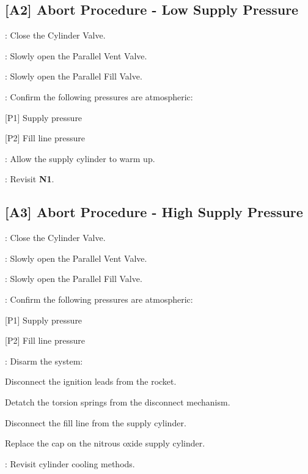 \begin{checklist}
\subsection{[A2] Abort Procedure - Low Supply Pressure}
\begin{checklist}
    \item \primary{}: Close the Cylinder Valve.
    \item \primary{}: Slowly open the Parallel Vent Valve.
    \item \primary{}: Slowly open the Parallel Fill Valve.
    \item \control{}: Confirm the following pressures are atmospheric:
    \begin{checklist}
        \item {[P1]} Supply pressure
        \item {[P2]} Fill line pressure
    \end{checklist}
    \item \primary{}: Allow the supply cylinder to warm up.
    \item \ops{}: Revisit \textbf{N1}.
\end{checklist}
\setcounter{checklistnum}{0}

\subsection{[A3] Abort Procedure - High Supply Pressure}
\begin{checklist}
    \item \primary{}: Close the Cylinder Valve.
    \item \primary{}: Slowly open the Parallel Vent Valve.
    \item \primary{}: Slowly open the Parallel Fill Valve.
    \item \control{}: Confirm the following pressures are atmospheric:
    \begin{checklist}
        \item {[P1]} Supply pressure
        \item {[P2]} Fill line pressure
    \end{checklist}
    \item \primary{}: Disarm the system:
        \begin{checklist}    
            \item Disconnect the ignition leads from the rocket.
            \item Detatch the torsion springs from the disconnect mechanism.
            \item Disconnect the fill line from the supply cylinder.
            \item Replace the cap on the nitrous oxide supply cylinder.
        \end{checklist}
    \item \ops{}: Revisit cylinder cooling methods.
\end{checklist}
\setcounter{checklistnum}{0}


\end{checklist}
